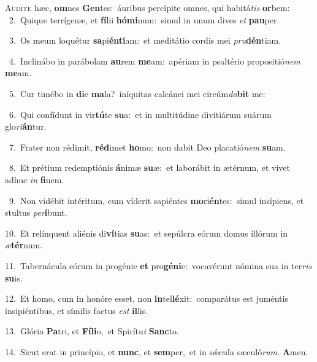 \lettrine{\initial\textcolor{\initialcolor}{A}}{udíte} hæc, \textbf{om}\-nes \textbf{Gen}\-tes:~\star áuribus percípite omnes, qui habitá\textit{tis} \textbf{or}\-bem:\\
{\numbfont\textcolor{\numbcolor}{~2.}}~Quique terrígenæ, et \textbf{fí}\-lii \textbf{hó}\-\textbf{mi}num:~\star simul in unum dives \textit{et} \textbf{pau}\-per.\par
{\numbfont\textcolor{\numbcolor}{~3.}}~Os meum loquétur \textbf{sa}\-pi\-\textbf{én}\-\textbf{ti}am:~\star et meditátio cordis mei \textit{pru}\-\textbf{dén}tiam.\par
{\numbfont\textcolor{\numbcolor}{~4.}}~Inclinábo in parábolam \textbf{au}\-rem \textbf{me}\-am:~\star apériam in psaltério propositió\textit{nem} \textbf{me}\-am.\par
{\numbfont\textcolor{\numbcolor}{~5.}}~Cur timébo in \textbf{di}\-e \textbf{ma}\-la?~\star iníquitas calcánei mei circúm\-\textit{da}\-\textbf{bit} me:\par
{\numbfont\textcolor{\numbcolor}{~6.}}~Qui confídunt in vir\-\textbf{tú}\-te \textbf{su}\-a:~\star et in multitúdine divitiárum suárum glo\-\textit{ri}\-\textbf{án}tur.\par
{\numbfont\textcolor{\numbcolor}{~7.}}~Frater non rédimit, \textbf{réd}\-imet \textbf{ho}\-mo:~\star non dabit Deo placatió\textit{nem} \textbf{su}\-am.\par
{\numbfont\textcolor{\numbcolor}{~8.}}~Et prétium redemptiónis \textbf{á}\-nimæ \textbf{su}\-æ:~\star et laborábit in ætérnum, et vivet adhuc \textit{in} \textbf{fi}\-nem.\par
{\numbfont\textcolor{\numbcolor}{~9.}}~Non vidébit intéritum, cum víderit sapiéntes \textbf{mo}\-ri\-\textbf{én}\-tes:~\star simul insípiens, et stultus \textit{per}\-\textbf{í}bunt.\par
{\numbfont\textcolor{\numbcolor}{10.}}~Et relínquent aliénis di\-\textbf{ví}\-tias \textbf{su}\-as:~\star et sepúlcra eórum domus illórum in \textit{æ}\-\textbf{tér}num.\par
{\numbfont\textcolor{\numbcolor}{11.}}~Tabernácula eórum in progénie \textbf{et} pro\-\textbf{gé}\-\textbf{ni}e:~\star vocavérunt nómina sua in ter\textit{ris} \textbf{su}\-is.\par
{\numbfont\textcolor{\numbcolor}{12.}}~Et homo, cum in honóre esset, non \textbf{in}\-tel\-\textbf{lé}\-xit:~\star comparátus est juméntis insipiéntibus, et símilis factus \textit{est} \textbf{il}\-lis.\par
{\numbfont\textcolor{\numbcolor}{13.}}~Glória \textbf{Pa}\-tri, et \textbf{Fí}\-\textbf{li}o,~\star et Spirítu\textit{i} \textbf{Sanc}\-to.\par
{\numbfont\textcolor{\numbcolor}{14.}}~Sicut erat in princípio, et \textbf{nunc}\-, et \textbf{sem}\-per,~\star et in sǽcula sæculó\-\textit{rum}\-. \textbf{A}\-men.\par
